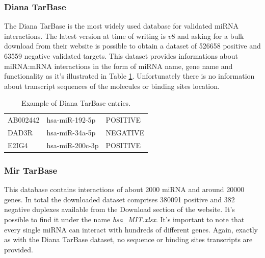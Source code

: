 \subsubsection{Diana TarBase}
The Diana TarBase is the most widely used database for validated miRNA interactions. The latest version at time of writing is $v8$ and asking for a bulk download from their website is possible to obtain a dataset of 526658 positive and 63559 negative validated targets. This dataset provides informations about miRNA:mRNA interactions in the form of miRNA name, gene name and functionality as it's illustrated in Table \ref{tab:Diana}. Unfortunately there is no information about transcript sequences of the molecules or binding sites location.

\begin{table}[!t]
	\caption{Example of Diana TarBase entries.}
	\label{tab:Diana}
	\centering
	\begin{tabular}{l l l}
		\toprule
		\tabhead{gene name} & \tabhead{miRNA name} & \tabhead{functionality} \\
		\midrule
		AB002442 & hsa-miR-192-5p & POSITIVE\\
		DAD3R & hsa-miR-34a-5p & NEGATIVE\\
		E2IG4 & hsa-miR-200c-3p & POSITIVE\\
		\bottomrule
	\end{tabular}
\end{table}

\subsubsection{Mir TarBase}
This database contains interactions of about 2000 miRNA and around 20000 genes. In total the downloaded dataset comprises 380091 positive and 382 negative duplexes available from the Download section of the website. It's possible to find it under the name \textit{hsa\_MIT.xlsx}. It's important to note that every single miRNA can interact with hundreds of different genes. Again, exactly as with the Diana TarBase dataset, no sequence or binding sites transcripts are provided.
 

